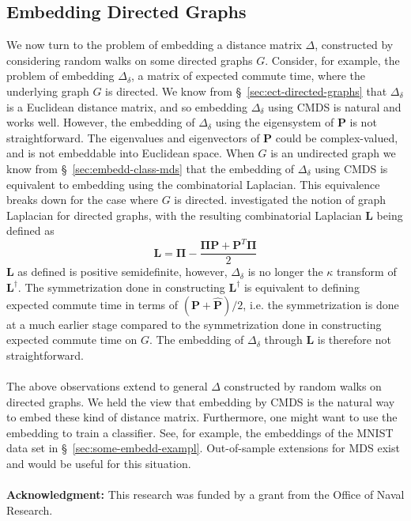 \documentclass[10pt,twocolumn]{article}
\numberwithin{equation}{section}
\begin{document}
\subsection{Embedding Directed Graphs}
\label{sec:embedd-dist-direct}
We now turn to the problem of embedding a distance matrix $\Delta$,
constructed by considering random walks on some directed graphs
$G$. Consider, for example, the problem of embedding $\Delta_{\delta}$,
a matrix of expected commute time, where the underlying graph $G$ is
directed. We know from \S~\ref{sec:ect-directed-graphs} that
$\Delta_{\delta}$ is a Euclidean distance matrix, and so embedding
$\Delta_\delta$ using CMDS is natural and works
well. However, the embedding of $\Delta_\delta$ using the eigensystem
of $\mathbf{P}$ is not straightforward. The eigenvalues and
eigenvectors of $\mathbf{P}$ could be complex-valued, and is not
embeddable into Euclidean space. When $G$ is an undirected graph we
know from \S~\ref{sec:embedd-class-mds} that the
embedding of $\Delta_{\delta}$ using CMDS is equivalent to
embedding using the combinatorial Laplacian. This equivalence breaks
down for the case where $G$ is directed. \cite{chung05:_laplac_cheeg}
investigated the notion of graph Laplacian for directed graphs, with the
resulting combinatorial Laplacian $\mathbf{L}$ being defined as
\begin{equation}
  \label{eq:31}
  \mathbf{L} = \bm{\Pi} - \frac{\bm{\Pi}\mathbf{P} + \mathbf{P}^{T}\bm{\Pi}}{2}
\end{equation}
$\mathbf{L}$ as defined is positive semidefinite, however,
$\Delta_{\delta}$ is no longer the $\kappa$ transform of
$\mathbf{L}^{\dagger}$. The symmetrization done in
constructing $\mathbf{L}^{\dagger}$ is equivalent to defining 
expected commute time in terms of $(\mathbf{P} + \hat{\mathbf{P}})/2$,
i.e. the symmetrization is done at a much earlier stage compared to
the symmetrization done in constructing expected commute time on $G$.
The embedding of $\Delta_{\delta}$ through
$\mathbf{L}$ is therefore not straightforward. \\ \\
%
\noindent
The above observations extend to general $\Delta$ constructed by
random walks on directed graphs. We held the view that embedding by
CMDS is the natural way to embed these kind of distance
matrix. Furthermore, one might want to use the embedding to train a
classifier. See, for example, the embeddings of the MNIST data set in
\S~\ref{sec:some-embedd-exampl}. Out-of-sample extensions for MDS
exist and would be useful for this situation. \\ \\
%
\noindent
{\bf Acknowledgment:} This research was funded by a grant from the
Office of Naval Research.
\appendix
\end{document}
